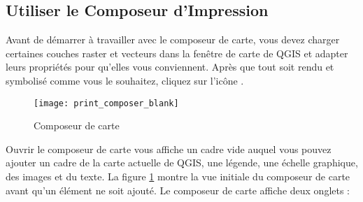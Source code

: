 {%
\subsection{Utiliser le Composeur d'Impression}\label{label_useprintcomposer} 


Avant de d\'emarrer \`a travailler avec le composeur de carte, vous devez charger
certaines couches raster et vecteurs dans la fen\^etre de carte de QGIS et 
adapter leurs propri\'et\'es pour qu'elles vous conviennent. Apr\`es que tout soit
rendu et symbolis\'e comme vous le souhaitez, cliquez sur l'ic\^one 
.

\begin{figure}[ht]
   \begin{center}
    \caption{Composeur de carte\nixcaption}
\label{fig:print_composer_blank}\smallskip
   \texttt{[image: print\_composer\_blank]}
\end{center}
\end{figure}

Ouvrir le composeur de carte vous affiche un cadre vide auquel vous pouvez
ajouter un cadre de la carte actuelle de QGIS, une l\'egende, une \'echelle
graphique, des images et du texte. La figure \ref{fig:print_composer_blank}
montre la vue initiale du composeur de carte avant qu'un \'el\'ement ne soit
ajout\'e. Le composeur de carte affiche deux onglets :

}
